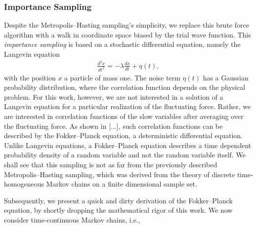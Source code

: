 \documentclass[11pt,a4paper]{article}
\numberwithin{equation}{section}
\begin{document}
\subsubsection{Importance Sampling}
%
%
Despite the Metropolis--Hasting sampling's simplicity, we replace this brute force algorithm with a walk in coordinate space biased by the trial wave function. 
%
This {\it importance sampling} is based on a stochastic differential equation, namely the Langevin equation
\begin{align*}
\frac{d^{2}x}{dt^{2}}=-\lambda \frac{dx}{dt}+\eta\left( t\right),
\end{align*}
with the position ${x}$ a particle of mass one. 
%
The noise term $\eta \left(t\right)$ has a Gaussian probability distribution, where the correlation function depends on the physical problem. 
%
For this work, however, we are not interested in a solution of a Langevin equation for a particular realization of the fluctuating force.
%
Rather, we are interested in correlation functions of the slow variables after averaging over the fluctuating force. 
%
As shown in [...], such correlation functions can be described by the Fokker--Planck equation, a deterministic differential equation. 
%
Unlike Langevin equations, a Fokker--Planck equation describes a time dependent probability density of a random variable and not the random variable itself.
%
We shall see that this sampling is not as far from the previously described  Metropolis--Hasting sampling, which was derived from the theory of discrete time-homogeneous Markov chains on a finite dimensional sample set.

%
Subsequently, we present a quick and dirty derivation of the Fokker--Planck equation, by shortly dropping the mathematical rigor of this work. 
%
We now consider time-continuous Markov chains, i.e.,
\end{document}
